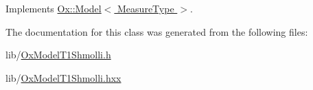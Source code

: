 Implements \hyperlink{class_ox_1_1_model_a694868476dd17a4d203f4ebc57047d2f}{Ox\-::\-Model$<$ Measure\-Type $>$}.



The documentation for this class was generated from the following files\-:\begin{DoxyCompactItemize}
\item 
lib/\hyperlink{_ox_model_t1_shmolli_8h}{Ox\-Model\-T1\-Shmolli.\-h}\item 
lib/\hyperlink{_ox_model_t1_shmolli_8hxx}{Ox\-Model\-T1\-Shmolli.\-hxx}\end{DoxyCompactItemize}

